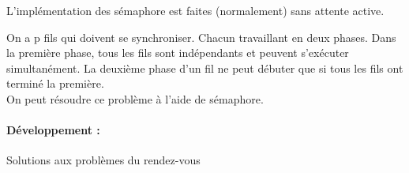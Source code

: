 \begin{proposition}
	L'implémentation des sémaphore est faites (normalement) sans attente active.
\end{proposition}

\begin{appl}
	On a p fils qui doivent se synchroniser. Chacun travaillant en deux phases. Dans la première phase, tous les fils sont indépendants et peuvent s’exécuter simultanément. La deuxième phase d'un fil ne peut débuter que si tous les fils ont terminé la première.\\
	
	On peut résoudre ce problème à l'aide de sémaphore.
\end{appl}

\paragraph{Développement :} Solutions aux problèmes du rendez-vous

